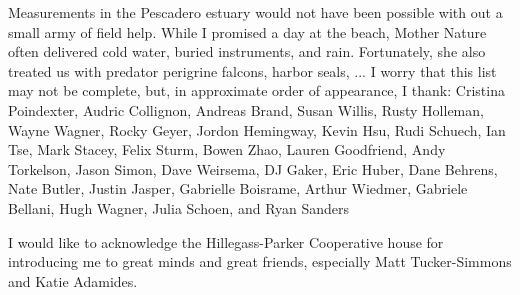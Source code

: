 


Measurements in the Pescadero estuary would not have been possible with out a small army of field help. While I promised a day at the beach, Mother Nature often delivered cold water, buried instruments, and rain. Fortunately, she also treated us with predator perigrine falcons, harbor seals, ... I worry that this list may not be complete, but, in approximate order of appearance, I thank: Cristina Poindexter, Audric Collignon, Andreas Brand, Susan Willis, Rusty Holleman, Wayne Wagner, Rocky Geyer, Jordon Hemingway, Kevin Hsu, Rudi Schuech, Ian Tse, Mark Stacey, Felix Sturm, Bowen Zhao, Lauren Goodfriend, Andy Torkelson, Jason Simon, Dave Weirsema, DJ Gaker, Eric Huber, Dane Behrens, Nate Butler, Justin Jasper, Gabrielle Boisrame, Arthur Wiedmer, Gabriele Bellani, Hugh Wagner, Julia Schoen, and Ryan Sanders

I would like to acknowledge the Hillegass-Parker Cooperative house for introducing me to great minds and great friends, especially Matt Tucker-Simmons and Katie Adamides. 


